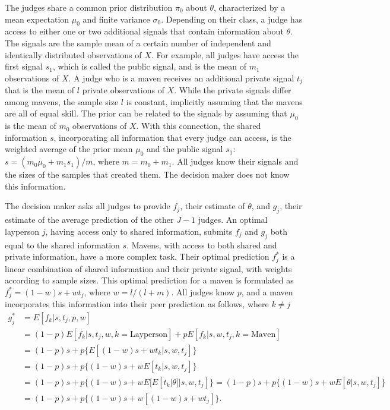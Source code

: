The judges share a common prior distribution $\pi_0$ about $\theta$, characterized by a mean expectation $\mu_0$ and finite variance $\sigma_0$. Depending on their class, a judge has access to either one or two additional signals that contain information about $\theta$. The signals are the sample mean of a certain number of independent and identically distributed observations of $X$. For example, all judges have access the first signal $s_1$, which is called the public signal, and is the mean of $m_1$ observations of $X$. A judge who is a maven receives an additional private signal $t_j$ that is the mean of $l$ private observations of $X$. While the private signals differ among mavens, the sample size $l$ is constant, implicitly assuming that the mavens are all of equal skill. The prior can be related to the signals by assuming that $\mu_0$ is the mean of $m_0$ observations of $X$. With this connection, the shared information $s$, incorporating all information that every judge can access, is the weighted average of the prior mean $\mu_0$ and the public signal $s_1$: $s = (m_0\mu_0 + m_1s_1)/m$, where $m = m_0 + m_1$. All judges know their signals and the sizes of the samples that created them. The decision maker does not know this information. 

The decision maker asks all judges to provide $f_j$, their estimate of $\theta$, and $g_j$, their estimate of the average prediction of the other $J-1$ judges. An optimal layperson $j$, having access only to shared information, submits $f_j$ and $g_j$ both equal to the shared information $s$. Mavens, with access to both shared and private information, have a more complex task. Their optimal prediction $f_j^*$ is a linear combination of shared information and their private signal, with weights according to sample sizes. This optimal prediction for a maven is formulated as $f_j^* = (1-w)s + wt_j$, where $w = l/(l+m)$. All judges know $p$, and a maven incorporates this information into their peer prediction as follows, where $k \neq j$
\begin{align*}
    g_j^* &= E[f_k|s, t_j, p,w] \\
     &= (1-p)E[f_k|s, t_j,w, k =\mathrm{Layperson}] + pE[f_k|s,w,t_j, k =\mathrm{Maven}] \\
     &= (1-p)s + p\{E[(1-w)s + wt_k|s,w,t_j]\} \\
     &= (1-p)s + p\{(1-w)s + wE[t_k|s,w,t_j]\} \\
     &= (1-p)s + p\{(1-w)s + wE[E[t_k|\theta]|s,w,t_j]\} = (1-p)s + p\{(1-w)s + wE[\theta|s,w,t_j]\} \\
     &= (1-p)s + p\{(1-w)s + w[(1-w)s + wt_j]\}.
\end{align*}


